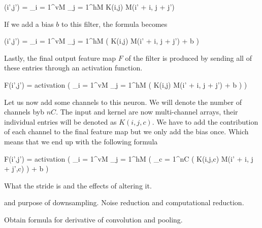 \startplaceformula
\startformula
\color[red]{F}(i',j') = \sum_{i = 1}^{vM} \sum_{j = 1}^{hM} K(i,j) \cdot M(i' + i, j + j')
\stopformula
\stopplaceformula

If we add a bias $b$ to this filter, the formula becomes

\startplaceformula
\startformula
\color[red]{F}(i',j') = \sum_{i = 1}^{vM} \sum_{j = 1}^{hM} \Bigl( K(i,j) \cdot M(i' + i, j + j') + b \Bigr)
\stopformula
\stopplaceformula

Lastly, the final output feature map $F$ of the filter is produced by sending all of these entries through an activation function.

\startplaceformula
\startformula
F(i',j') = {\rm activation} \left( \sum_{i = 1}^{vM} \sum_{j = 1}^{hM} \Bigl( K(i,j) \cdot M(i' + i, j + j') + b \Bigr) \right)
\stopformula
\stopplaceformula

\startplacefigure[reference=conv-operation,
                   title={The basic forward operation of a convolutional layer},
                   location=top]
{}{}
{}{}
{}{}
{}{}
{}{}
{}{}
{}{}
{}{}
\stopcombination
\stopplacefigure

\startsubsubsection[title=Multiple channels]
Let us now add some channels to this neuron.
We will denote the number of channels byb $nC$.
The input and kernel are now multi-channel arrays, their individual entries will be denoted as $K(i,j,c)$.
We have to add the contribution of each channel to the final feature map but we only add the bias once.
Which means that we end up with the following formula

\startplaceformula
\startformula
F(i',j') = {\rm activation} \left( \sum_{i = 1}^{vM} \sum_{j = 1}^{hM} \left( \sum_{c = 1}^{nC} \Bigl( K(i,j,c) \cdot M(i' + i, j + j',c) \right) + b \right)
\stopformula
\stopplaceformula
\stopsubsubsection

\startsubsubsection[title=Altering the stride]
What the stride is and the effects of altering it.
\stopsubsubsection

\startsubsubsection[title=Zero padding]
\stopsubsubsection

 and purpose of downsampling.
Noise reduction and computational reduction.
\stopsubsection

\startsubsection[title=Backward Propagation]
Obtain formula for derivative of convolution and pooling.
\stopsubsection
\stopsection